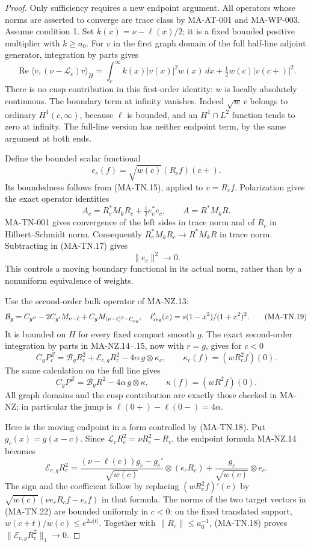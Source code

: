 \begin{proof}
Only sufficiency requires a new endpoint argument.
All operators whose norms are asserted to converge are
trace class by MA-AT-001 and MA-WP-003.
Assume condition 1.  Set \(k(x)=\nu-\ell(x)/2\);
it is a fixed bounded positive multiplier with \(k\ge a_0\).
For \(v\) in the first graph domain of the full half-line
adjoint generator, integration by parts gives
\[
 \operatorname{Re}\langle v,(\nu-\mathcal L_c)v\rangle_H
       =\int_c^\infty k(x)|v(x)|^2w(x)\,dx
                     +\tfrac12 w(c)|v(c+)|^2 .
 \tag{MA-TN.15}
\]
There is no cusp contribution in this first-order identity:
\(w\) is locally absolutely continuous.  The boundary
term at infinity vanishes.  Indeed
\(\sqrt w\,v\) belongs to ordinary \(H^1(c,\infty)\),
because \(\ell\) is bounded, and an \(H^1\cap L^2\)
function tends to zero at infinity.
The full-line version has neither endpoint term, by
the same argument at both ends.

Define the bounded scalar functional
\[
       e_c(f)=\sqrt{w(c)}(R_cf)(c+).
 \tag{MA-TN.16}
\]
Its boundedness follows from (MA-TN.15), applied to
\(v=R_cf\).  Polarization gives the exact operator identities
\[
 A_c=R_c^*M_kR_c+\tfrac12e_c^*e_c,\qquad
 A=R^*M_kR .
 \tag{MA-TN.17}
\]
MA-TN-001 gives convergence of the left sides in trace norm
and of \(R_c\) in Hilbert--Schmidt norm.  Consequently
\(R_c^*M_kR_c\to R^*M_kR\) in trace norm.  Subtracting
in (MA-TN.17) gives
\[
                         \|e_c\|^2\longrightarrow0 .
 \tag{MA-TN.18}
\]
This controls a moving boundary functional in its actual
norm, rather than by a nonuniform equivalence of weights.

Use the second-order bulk operator of MA-NZ.13:
\[
 \mathcal B_g=C_{g''}-2C_{g'}M_{\nu-\ell}
             +C_gM_{(\nu-\ell)^2-\ell'_{\rm reg}},
 \quad
 \ell'_{\rm reg}(x)=s(1-x^2)/(1+x^2)^2.
 \tag{MA-TN.19}
\]
It is bounded on \(H\) for every fixed compact smooth \(g\).
The exact second-order integration by parts in MA-NZ.14--.15,
now with \(r=g\), gives for \(c<0\)
\[
 C_gP_c^Z=\mathcal B_gR_c^2+\mathcal E_{c,g}R_c^2
                              -4\alpha\,g\otimes\kappa_c,
 \qquad
 \kappa_c(f)=(wR_c^2f)(0).
 \tag{MA-TN.20}
\]
The same calculation on the full line gives
\[
             C_gP^Z=\mathcal B_gR^2-4\alpha\,g\otimes\kappa,
 \qquad \kappa(f)=(wR^2f)(0).
 \tag{MA-TN.21}
\]
All graph domains and the cusp contribution are exactly
those checked in MA-NZ; in particular the jump is
\(\ell(0+)-\ell(0-)=4\alpha\).

Here is the moving endpoint in a form controlled by
(MA-TN.18).  Put \(g_c(x)=g(x-c)\).  Since
\(\mathcal L_cR_c^2=\nu R_c^2-R_c\), the endpoint
formula MA-NZ.14 becomes
\[
 \mathcal E_{c,g}R_c^2
  =\frac{(\nu-\ell(c))g_c-g_c'}{\sqrt{w(c)}}
                                  \otimes(e_cR_c)
       +\frac{g_c}{\sqrt{w(c)}}\otimes e_c .
 \tag{MA-TN.22}
\]
The sign and the coefficient follow by replacing
\((wR_c^2f)'(c)\) by
\(\sqrt{w(c)}(\nu e_cR_cf-e_cf)\) in that formula.
The norms of the two target vectors in (MA-TN.22)
are bounded uniformly in \(c<0\): on the fixed translated
support, \(w(c+t)/w(c)\le e^{2\omega|t|}\).
Together with \(\|R_c\|\le a_0^{-1}\), (MA-TN.18) proves
\(\|\mathcal E_{c,g}R_c^2\|_1\to0\).


\end{proof}
